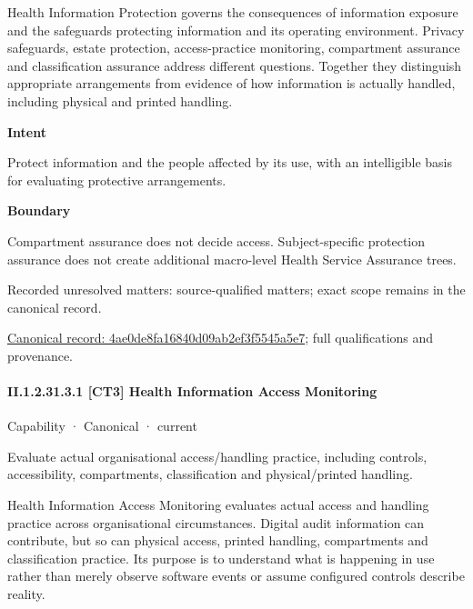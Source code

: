 Health Information Protection governs the consequences of information exposure and the safeguards protecting information and its operating environment. Privacy safeguards, estate protection, access-practice monitoring, compartment assurance and classification assurance address different questions. Together they distinguish appropriate arrangements from evidence of how information is actually handled, including physical and printed handling.



\textbf{Intent}



Protect information and the people affected by its use, with an intelligible basis for evaluating protective arrangements.



\textbf{Boundary}



Compartment assurance does not decide access. Subject-specific protection assurance does not create additional macro-level Health Service Assurance trees.


{\small Recorded unresolved matters: source-qualified matters; exact scope remains in the canonical record.}\par
{\footnotesize \href{../../../../continuum/strategy/capability/4ae0de8fa16840d09ab2ef3f5545a5e7.md}{Canonical record: 4ae0de8fa16840d09ab2ef3f5545a5e7}; full qualifications and provenance.}\par
\paragraph*{II.1.2.31.3.1 [CT3] Health Information Access Monitoring}
\label{navigation:II.1.2.31.3.1}

\label{element:01854c7311404bbf9f698fce4656b54d}
{\small Capability · Canonical · current}\par

Evaluate actual organisational access/handling practice, including controls, accessibility, compartments, classification and physical/printed handling.



Health Information Access Monitoring evaluates actual access and handling practice across organisational circumstances. Digital audit information can contribute, but so can physical access, printed handling, compartments and classification practice. Its purpose is to understand what is happening in use rather than merely observe software events or assume configured controls describe reality.



